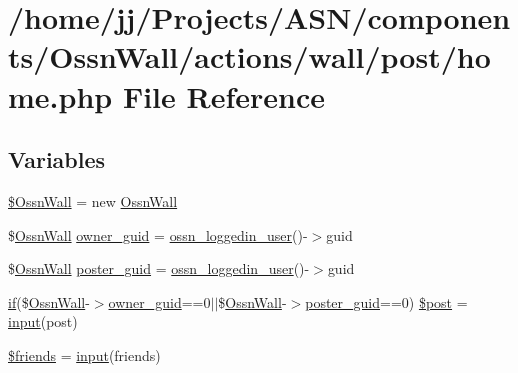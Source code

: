 \hypertarget{components_2_ossn_wall_2actions_2wall_2post_2home_8php}{}\section{/home/jj/\+Projects/\+A\+S\+N/components/\+Ossn\+Wall/actions/wall/post/home.php File Reference}
\label{components_2_ossn_wall_2actions_2wall_2post_2home_8php}
\subsection*{Variables}
\begin{DoxyCompactItemize}
\item 
\hyperlink{components_2_ossn_wall_2actions_2wall_2post_2home_8php_a3fe8a689739786120fddd91dedeb172b}{\$\+Ossn\+Wall} = new \hyperlink{class_ossn_wall}{Ossn\+Wall}
\item 
\$\hyperlink{class_ossn_wall}{Ossn\+Wall} \hyperlink{components_2_ossn_wall_2actions_2wall_2post_2home_8php_a307051fefc937afd02c509c55646f50b}{owner\+\_\+guid} = \hyperlink{ossn_8lib_8users_8php_aa3c8068d0e6638b414d6a2f6c62565b8}{ossn\+\_\+loggedin\+\_\+user}()-\/$>$guid
\item 
\$\hyperlink{class_ossn_wall}{Ossn\+Wall} \hyperlink{components_2_ossn_wall_2actions_2wall_2post_2home_8php_a24eb7b66e353d8983f6f2af979250671}{poster\+\_\+guid} = \hyperlink{ossn_8lib_8users_8php_aa3c8068d0e6638b414d6a2f6c62565b8}{ossn\+\_\+loggedin\+\_\+user}()-\/$>$guid
\item 
\hyperlink{jquery_8tokeninput_8js_ad8dd46a3cbc004569e34401e9e71771a}{if}(\$\hyperlink{class_ossn_wall}{Ossn\+Wall}-\/$>$\hyperlink{user_8php_a307051fefc937afd02c509c55646f50b}{owner\+\_\+guid}==0$\vert$$\vert$\$\hyperlink{class_ossn_wall}{Ossn\+Wall}-\/$>$\hyperlink{user_8php_a24eb7b66e353d8983f6f2af979250671}{poster\+\_\+guid}==0) \hyperlink{components_2_ossn_wall_2actions_2wall_2post_2home_8php_ab0afe281b4fde7dbdeff7f1ced2b0b1f}{\$post} = \hyperlink{ossn_8lib_8input_8php_a64ebee98b041c4f75f71ed3cd73cc8ed}{input}(\textquotesingle{}post\textquotesingle{})
\item 
\hyperlink{components_2_ossn_wall_2actions_2wall_2post_2home_8php_afb66104a0d5a5b286634a265d216b8d6}{\$friends} = \hyperlink{ossn_8lib_8input_8php_a64ebee98b041c4f75f71ed3cd73cc8ed}{input}(\textquotesingle{}friends\textquotesingle{})
\item 
$$
\end{DoxyCompactItemize}
